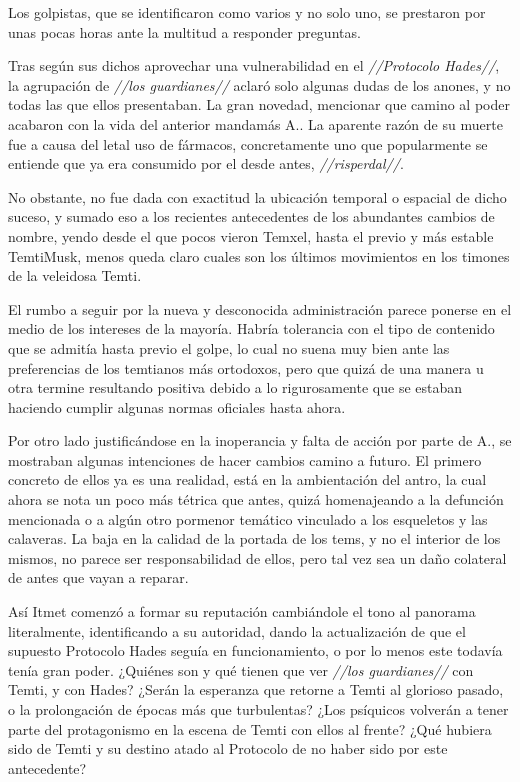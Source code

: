 \documentclass[
  spanish,
]{book}
\begin{document}
Los golpistas, que se identificaron como varios y no solo uno, se prestaron por unas pocas horas ante la multitud a responder preguntas.

Tras según sus dichos aprovechar una vulnerabilidad en el \emph{//Protocolo Hades//}, la agrupación de \emph{//los guardianes//} aclaró solo algunas dudas de los anones, y no todas las que ellos presentaban. La gran novedad, mencionar que camino al poder acabaron con la vida del anterior mandamás A.. La aparente razón de su muerte fue a causa del letal uso de fármacos, concretamente uno que popularmente se entiende que ya era consumido por el desde antes, \emph{//risperdal//}.

No obstante, no fue dada con exactitud la ubicación temporal o espacial de dicho suceso, y sumado eso a los recientes antecedentes de los abundantes cambios de nombre, yendo desde el que pocos vieron Temxel, hasta el previo y más estable TemtiMusk, menos queda claro cuales son los últimos movimientos en los timones de la veleidosa Temti.

El rumbo a seguir por la nueva y desconocida administración parece ponerse en el medio de los intereses de la mayoría. Habría tolerancia con el tipo de contenido que se admitía hasta previo el golpe, lo cual no suena muy bien ante las preferencias de los temtianos más ortodoxos, pero que quizá de una manera u otra termine resultando positiva debido a lo rigurosamente que se estaban haciendo cumplir algunas normas oficiales hasta ahora.

Por otro lado justificándose en la inoperancia y falta de acción por parte de A., se mostraban algunas intenciones de hacer cambios camino a futuro. El primero concreto de ellos ya es una realidad, está en la ambientación del antro, la cual ahora se nota un poco más tétrica que antes, quizá homenajeando a la defunción mencionada o a algún otro pormenor temático vinculado a los esqueletos y las calaveras. La baja en la calidad de la portada de los tems, y no el interior de los mismos, no parece ser responsabilidad de ellos, pero tal vez sea un daño colateral de antes que vayan a reparar.

Así Itmet comenzó a formar su reputación cambiándole el tono al panorama literalmente, identificando a su autoridad, dando la actualización de que el supuesto Protocolo Hades seguía en funcionamiento, o por lo menos este todavía tenía gran poder. ¿Quiénes son y qué tienen que ver \emph{//los guardianes//} con Temti, y con Hades? ¿Serán la esperanza que retorne a Temti al glorioso pasado, o la prolongación de épocas más que turbulentas? ¿Los psíquicos volverán a tener parte del protagonismo en la escena de Temti con ellos al frente? ¿Qué hubiera sido de Temti y su destino atado al Protocolo de no haber sido por este antecedente?
\end{document}
